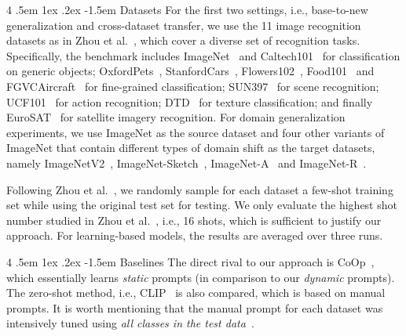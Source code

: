 \documentclass[10pt,twocolumn,letterpaper]{article}
\makeatletter
\renewcommand\paragraph{
  \@startsection{paragraph} %
  {4} %
  {\z@} %
  {.5em \@plus1ex \@minus.2ex} %
  {-1.5em} %
  {\normalfont\normalsize\bfseries} %
}
\makeatother
\begin{document}
\paragraph{Datasets}
For the first two settings, i.e., base-to-new generalization and cross-dataset transfer, we use the 11 image recognition datasets as in Zhou et al.~\cite{zhou2021coop}, which cover a diverse set of recognition tasks. Specifically, the benchmark includes ImageNet~\cite{deng2009imagenet} and Caltech101~\cite{fei2004learning} for classification on generic objects; OxfordPets~\cite{parkhi2012cats}, StanfordCars~\cite{krause20133d}, Flowers102~\cite{nilsback2008automated}, Food101~\cite{bossard2014food} and FGVCAircraft~\cite{maji2013fine} for fine-grained classification; SUN397~\cite{xiao2010sun} for scene recognition; UCF101~\cite{soomro2012ucf101} for action recognition; DTD~\cite{cimpoi2014describing} for texture classification; and finally EuroSAT~\cite{helber2019eurosat} for satellite imagery recognition. For domain generalization experiments, we use ImageNet as the source dataset and four other variants of ImageNet that contain different types of domain shift as the target datasets, namely ImageNetV2~\cite{recht2019imagenet}, ImageNet-Sketch~\cite{wang2019learning}, ImageNet-A~\cite{hendrycks2021natural} and ImageNet-R~\cite{hendrycks2021many}.

Following Zhou et al.~\cite{zhou2021coop}, we randomly sample for each dataset a few-shot training set while using the original test set for testing. We only evaluate the highest shot number studied in Zhou et al.~\cite{zhou2021coop}, i.e., 16 shots, which is sufficient to justify our approach. For learning-based models, the results are averaged over three runs.

\paragraph{Baselines}
The direct rival to our approach is CoOp~\cite{zhou2021coop}, which essentially learns \emph{static} prompts (in comparison to our \emph{dynamic} prompts). The zero-shot method, i.e., CLIP~\cite{radford2021learning} is also compared, which is based on manual prompts. It is worth mentioning that the manual prompt for each dataset was intensively tuned using \emph{all classes in the test data}~\cite{radford2021learning}.
\end{document}
